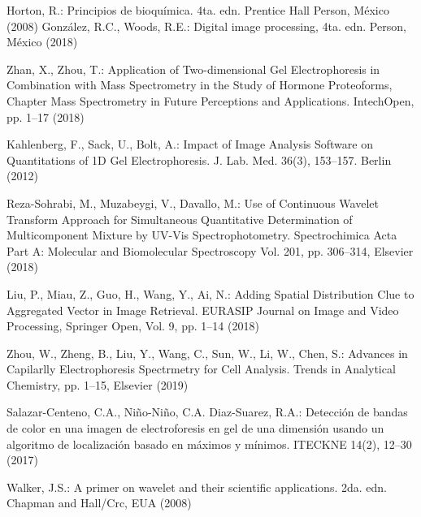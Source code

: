 \documentclass[a4paper]{llncs}
\begin{document}
\begin{thebibliography}{88}
%
Horton, R.: Principios de bioqu\'imica. 4ta. edn. Prentice Hall Person, M\'exico (2008)
%
Gonz\'alez, R.C., Woods, R.E.: Digital image processing, 4ta. edn. Person, M\'exico (2018)


Zhan, X., Zhou, T.: Application of Two-dimensional Gel Electrophoresis in Combination with Mass Spectrometry in the Study of Hormone Proteoforms, Chapter Mass Spectrometry in Future Perceptions and Applications. IntechOpen, pp. 1--17 (2018)

 Kahlenberg, F., Sack, U., Bolt, A.: Impact of Image Analysis Software on Quantitations of 1D Gel Electrophoresis. J. Lab. Med. 36(3), 153--157. Berlin (2012)

Reza-Sohrabi, M., Muzabeygi, V., Davallo, M.: Use of Continuous Wavelet Transform Approach for Simultaneous Quantitative Determination of Multicomponent Mixture by UV-Vis Spectrophotometry. Spectrochimica Acta Part A: Molecular and Biomolecular Spectroscopy Vol. 201, pp. 306--314,  Elsevier (2018)

 Liu, P., Miau, Z., Guo, H., Wang, Y., Ai, N.: Adding Spatial Distribution Clue to  Aggregated Vector in Image Retrieval. EURASIP Journal on Image and Video Processing, Springer Open, Vol. 9, pp. 1--14 (2018) 

Zhou, W., Zheng, B., Liu, Y., Wang, C., Sun, W., Li, W., Chen, S.: Advances in Capilarlly Electrophoresis Spectrmetry for Cell Analysis. Trends in Analytical Chemistry, pp. 1--15, Elsevier (2019) 

%
Salazar-Centeno, C.A., Niño-Niño, C.A. Diaz-Suarez, R.A.: Detecci\'on de bandas de color en una imagen de electroforesis en gel de una dimensi\'on usando un algoritmo de localizaci\'on basado en m\'aximos y m\'inimos. ITECKNE 14(2), 12--30 (2017)



%
%
%
%

Walker, J.S.: A primer on wavelet and their scientific applications. 2da. edn. Chapman and Hall/Crc, EUA (2008)


\end{thebibliography}
\end{document}
